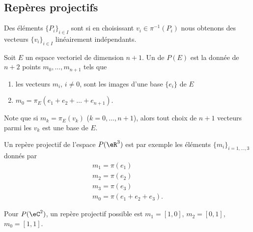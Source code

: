\subsection{Repères projectifs}


\begin{definition}
	Des éléments \( \{ P_i \}_{i\in I}\) sont  si en choisissant \( v_i\in\pi^{-1}(P_i)\) nous obtenons des vecteurs \( \{ v_i \}_{i\in I}\) linéairement indépendants.
\end{definition}

\begin{definition}      \label{DEFooPZKFooDBXtEn}
	Soit \( E\) un espace vectoriel de dimension \( n+1\). Un  de \( P(E)\) est la donnée de \( n+2\) points \( m_0,\ldots, m_{n+1}\) tels que
	\begin{enumerate}
		\item
		      les vecteurs \( m_i\), \( i\neq 0\), sont les images d'une base \( \{ e_i \}\) de \( E\)
		\item
		      \( m_0=\pi_E(e_1+e_2+\ldots +e_{n+1})\).
	\end{enumerate}
\end{definition}
Note que si \( m_k=\pi_E(v_k)\) (\( k=0,\ldots, n+1\)), alors tout choix de \( n+1\) vecteurs parmi les \( v_k\) est une base de \( E\).

\begin{example}
	Un repère projectif de l'espace \( P(\eR^3)\) est par exemple les éléments \( \{ m_i \}_{i=1,\ldots, 3}\) donnés par
	\begin{subequations}
		\begin{align}
			m_1=\pi(e_1) \\
			m_2=\pi(e_2) \\
			m_3=\pi(e_3) \\
			m_0=\pi(e_1+e_2+e_3).
		\end{align}
	\end{subequations}
\end{example}

\begin{example}
	Pour \( P(\eC^2)\), un repère projectif possible est \( m_1=[1,0]\), \( m_2=[0,1]\), \( m_0=[1,1]\).
\end{example}

